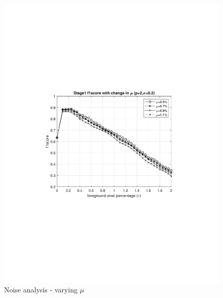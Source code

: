 \begin{figure}[ht]
    \centering
    \includegraphics[width=\linewidth,trim={300 670 300 690},clip]{images/noise-analysis-mog-mu.jpg}
    \caption{Noise analysis - varying $\mu$}
    \label{fig:noise-analysis-mog-mu}
\end{figure}